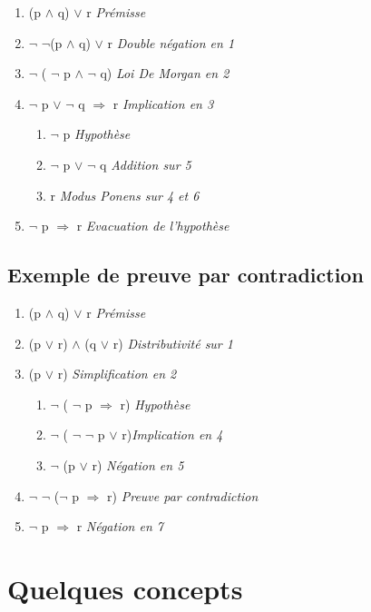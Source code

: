 \begin{enumerate}
\item (p $\land$ q) $\lor$ r  \textit{Prémisse}
\item $\lnot$ $\lnot$(p $\land$ q) $\lor$ r \textit{Double négation en 1}
\item $\lnot$ ( $\lnot$ p $\land$ $\lnot$ q) \textit{Loi De Morgan en 2}
\item $\lnot$ p $\lor$ $\lnot$ q $\Rightarrow$ r \textit{Implication en 3}

\begin{enumerate}
 \item  $\lnot$ p \textit{Hypothèse}
 \item  $\lnot$ p $\lor$ $\lnot$ q \textit{ Addition sur 5}
 \item  r \textit{ Modus Ponens sur 4 et 6}
\end{enumerate}

\item  $\lnot$ p $\Rightarrow$ r \textit{Evacuation de l'hypothèse}
\end{enumerate}

\subsection{Exemple de preuve par contradiction}

\begin{enumerate}
\item  (p $\land$ q) $\lor$ r  \textit{Prémisse}
\item  (p  $\lor$ r) $\land$ (q $\lor$ r) \textit{Distributivité sur 1}
\item  (p $\lor$ r)  \textit{Simplification en 2}

\begin{enumerate}
 \item $\lnot$ ( $\lnot$ p $\Rightarrow$ r)  \textit{Hypothèse}
 \item $\lnot$ ( $\lnot$ $\lnot$ p $\lor$ r)\textit{Implication en 4}
 \item $\lnot$ (p $\lor$ r) \textit{ Négation en 5}
\end{enumerate}

\item $\lnot$ $\lnot$ ($\lnot$ p $\Rightarrow$ r)  \textit{ Preuve par contradiction}
\item $\lnot$ p $\Rightarrow$ r \textit{Négation en 7}
\end{enumerate}


\section{Quelques concepts}
